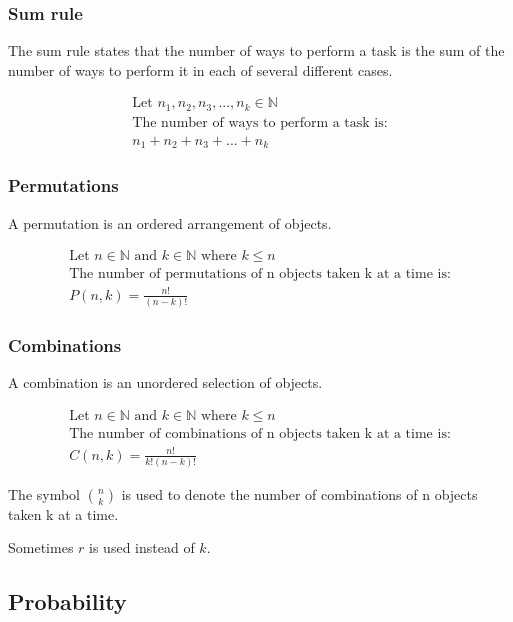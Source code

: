 \documentclass{article}
\begin{document}
\subsubsection{Sum rule}

The sum rule states that the number of ways to perform a task is the sum of the number of ways to perform it in each of several different cases.

\begin{align*}
    \text{Let } n_1, n_2, n_3, ..., n_k \in \mathbb{N} \\
    \text{The number of ways to perform a task is:}    \\
    n_1 + n_2 + n_3 + ... + n_k
\end{align*}

\subsubsection{Permutations}

A permutation is an ordered arrangement of objects.

\begin{align*}
    \text{Let } n \in \mathbb{N} \text{ and } k \in \mathbb{N} \text{ where } k \leq n \\
    \text{The number of permutations of n objects taken k at a time is:}               \\
    P(n, k) = \frac{n!}{(n - k)!}
\end{align*}

\subsubsection{Combinations}

A combination is an unordered selection of objects.

\begin{align*}
    \text{Let } n \in \mathbb{N} \text{ and } k \in \mathbb{N} \text{ where } k \leq n \\
    \text{The number of combinations of n objects taken k at a time is:}               \\
    C(n, k) = \frac{n!}{k!(n - k)!}
\end{align*}

The symbol $\binom{n}{k}$ is used to denote the number of combinations of n objects taken k at a time.

Sometimes $r$ is used instead of $k$.

\subsection{Probability}
\end{document}
